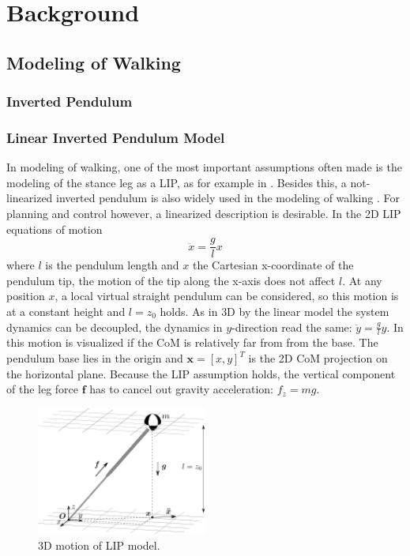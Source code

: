 %
\chapter{Background}
\section{Modeling of Walking}

\subsection{Inverted Pendulum}

\subsection{Linear Inverted Pendulum Model}
In modeling of walking, one of the most important assumptions often made is the modeling of the stance leg as a \acf{LIP}, as for example in \cite{kajita20013d}. Besides this, a not-linearized inverted pendulum is also widely used in the modeling of walking \cite{kuo2005energetic}. For planning and control however, a linearized description is desirable. In the \ac{2D} \ac{LIP} equations of motion
\begin{equation}
\ddot{x}=\frac{g}{l}x
\label{eq:LIPeom}
\end{equation}
where $l$ is the pendulum length and $x$ the Cartesian x-coordinate of the pendulum tip, the motion of the tip along the x-axis does not affect $l$. At any position $x$, a local virtual straight pendulum can be considered, so this motion is at a constant height and $l=z_0$  holds. As in \ac{3D} by the linear model the system dynamics can be decoupled, the dynamics in $y$-direction read the same: $\ddot{y}=\frac{g}{l} y$. In  this motion is visualized if the \ac{CoM} is relatively far from from the base. The pendulum base lies in the origin and $\boldsymbol{x} = [x,y]^T$ is the \ac{2D} \ac{CoM} projection on the horizontal plane. Because the \ac{LIP} assumption holds, the vertical component of the leg force $\boldsymbol{f}$ has to cancel out gravity acceleration: $f_z=mg$.
\begin{figure}[h]
\centering
\includegraphics[width=0.5\textwidth]{STYLESTUFF/3DCoMwithoutfoot.png}
\caption{\ac{3D} motion of \ac{LIP} model.}
\label{fig:3dlip}
\end{figure}

